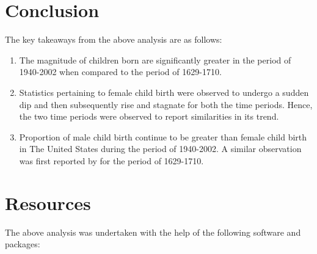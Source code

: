 \documentclass[11pt,a4paper,]{article}
\providecommand{\tightlist}{%
  \setlength{\itemsep}{0pt}\setlength{\parskip}{0pt}}
\begin{document}
\hypertarget{conclusion}{%
\section{Conclusion}\label{conclusion}}

The key takeaways from the above analysis are as follows:

\begin{enumerate}
\def\labelenumi{\arabic{enumi}.}
\tightlist
\item
  The magnitude of children born are significantly greater in the period of 1940-2002 when compared to the period of 1629-1710.
\item
  Statistics pertaining to female child birth were observed to undergo a sudden dip and then subsequently rise and stagnate for both the time periods. Hence, the two time periods were observed to report similarities in its trend.
\item
  Proportion of male child birth continue to be greater than female child birth in The United States during the period of 1940-2002. A similar observation was first reported by \textcite{arbuthnot1710ii} for the period of 1629-1710.
\end{enumerate}

\newpage

\hypertarget{resources}{%
\section{Resources}\label{resources}}

The above analysis was undertaken with the help of the following software and packages:
\end{document}
